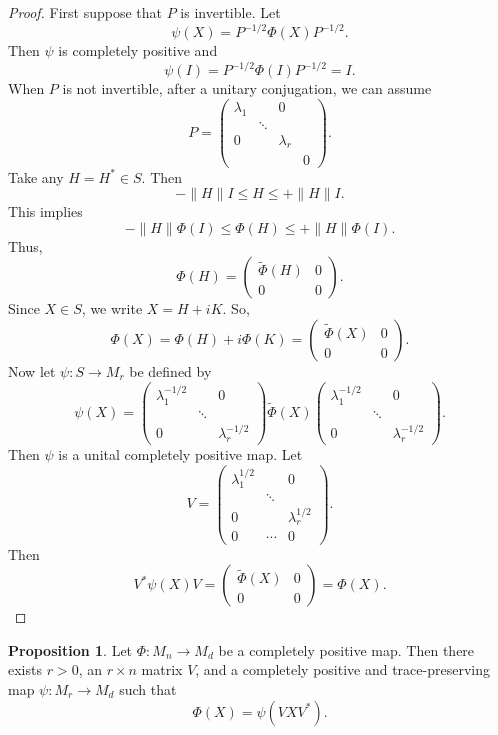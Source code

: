 \documentclass[12pt]{article}
\theoremstyle{definition}
\newtheorem*{proposition}{Proposition}
\begin{document}
\begin{proof}
First suppose that $P$ is invertible. Let
\[
\psi(X)=P^{-1/2}\Phi(X)P^{-1/2}.
\]
Then $\psi$ is completely positive and
\[
\psi(I)=P^{-1/2}\Phi(I)P^{-1/2}=I.
\]
When $P$ is not invertible, after a unitary conjugation, we can assume
\[
P=\begin{pmatrix}\lambda_1 & & 0\\ & \ddots & \\ 0 & & \lambda_r\\ & & & 0\end{pmatrix}.
\]
Take any $H=H^* \in S$. Then
\[
-\|H\|I \leq H \leq +\|H\|I.
\]
This implies
\[
-\|H\|\Phi(I) \leq \Phi(H) \leq +\|H\|\Phi(I).
\]
Thus,
\[
\Phi(H)=\begin{pmatrix}\widetilde{\Phi}(H) & 0\\ 0 & 0\end{pmatrix}.
\]
Since $X \in S$, we write $X=H+iK$. So,
\[
\Phi(X)=\Phi(H)+i\Phi(K)=\begin{pmatrix}\widetilde{\Phi}(X) & 0\\ 0 & 0\end{pmatrix}.
\]
Now let $\psi:S \to M_r$ be defined by
\[
\psi(X)=\begin{pmatrix}\lambda_1^{-1/2} & & 0\\ & \ddots & \\ 0 & & \lambda_r^{-1/2}\end{pmatrix}\widetilde{\Phi}(X)\begin{pmatrix}\lambda_1^{-1/2} & & 0\\ & \ddots & \\ 0 & & \lambda_r^{-1/2}\end{pmatrix}.
\]
Then $\psi$ is a unital completely positive map. Let
\[
V=\begin{pmatrix}\lambda_1^{1/2} & & 0\\ & \ddots & \\ 0 & & \lambda_r^{1/2}\\ 0 & \cdots & 0\end{pmatrix}.
\]
Then
\[
V^*\psi(X)V=\begin{pmatrix}\widetilde{\Phi}(X) & 0\\ 0 & 0\end{pmatrix}=\Phi(X).
\]
\end{proof}

\begin{proposition}
Let $\Phi:M_n \to M_d$ be a completely positive map. Then there exists $r>0$, an $r \times n$ matrix $V$, and a completely positive and trace-preserving map $\psi:M_r \to M_d$ such that
\[
\Phi(X)=\psi(VXV^*).
\]
\end{proposition}
\end{document}
